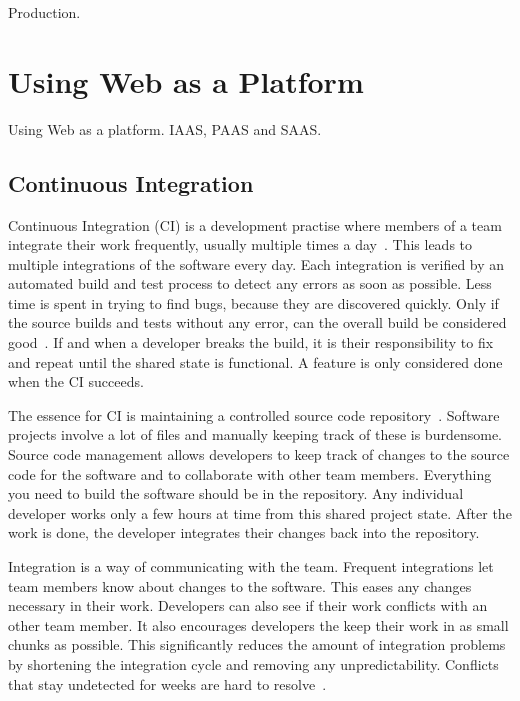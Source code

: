 \documentclass[english]{tktltiki2}
\begin{document}
Production.


\section{Using Web as a Platform}

Using Web as a platform. IAAS, PAAS and SAAS.

\subsection{Continuous Integration}

Continuous Integration (CI) is a development practise where members of a team integrate their work frequently, usually multiple times a day~\cite{Fow06}. This leads to multiple integrations of the software every day. Each integration is verified by an automated build and test process to detect any errors as soon as possible. Less time is spent in trying to find bugs, because they are discovered quickly. Only if the source builds and tests without any error, can the overall build be considered good~\cite{Fow06}. If and when a developer breaks the build, it is their responsibility to fix and repeat until the shared state is functional. A feature is only considered done when the CI succeeds.

The essence for CI is maintaining a controlled source code repository~\cite{Fow06}. Software projects involve a lot of files and manually keeping track of these is burdensome. Source code management allows developers to keep track of changes to the source code for the software and to collaborate with other team members. Everything you need to build the software should be in the repository. Any individual developer works only a few hours at time from this shared project state. After the work is done, the developer integrates their changes back into the repository.

Integration is a way of communicating with the team. Frequent integrations let team members know about changes to the software. This eases any changes necessary in their work. Developers can also see if their work conflicts with an other team member. It also encourages developers the keep their work in as small chunks as possible. This significantly reduces the amount of integration problems by shortening the integration cycle and removing any unpredictability. Conflicts that stay undetected for weeks are hard to resolve~\cite{Fow06}.
\end{document}
